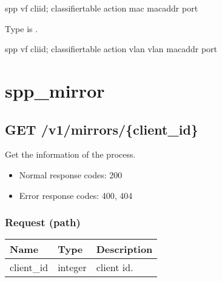 \documentclass[a4paper,11pt,openany,oneside,english]{sphinxmanual}
\begin{document}
\begin{sphinxVerbatim}[commandchars=\\\{\},formatcom=\footnotesize]
spp \PYGZgt{} vf \PYGZob{}cli\PYGZus{}id\PYGZcb{}; classifier\PYGZus{}table \PYGZob{}action\PYGZcb{} mac \PYGZob{}mac\PYGZus{}addr\PYGZcb{} \PYGZob{}port\PYGZcb{}
\end{sphinxVerbatim}

Type is .

\begin{sphinxVerbatim}[commandchars=\\\{\},formatcom=\footnotesize]
spp \PYGZgt{} vf \PYGZob{}cli\PYGZus{}id\PYGZcb{}; classifier\PYGZus{}table \PYGZob{}action\PYGZcb{} vlan \PYGZob{}vlan\PYGZcb{} \PYGZob{}mac\PYGZus{}addr\PYGZcb{} \PYGZob{}port\PYGZcb{}
\end{sphinxVerbatim}


\section{spp\_mirror}
\label{\detokenize{api_ref/spp_mirror:spp-mirror}}\label{\detokenize{api_ref/spp_mirror:spp-ctl-rest-api-spp-mirror}}\label{\detokenize{api_ref/spp_mirror::doc}}

\subsection{GET /v1/mirrors/\{client\_id\}}
\label{\detokenize{api_ref/spp_mirror:get-v1-mirrors-client-id}}
Get the information of the  process.
\begin{itemize}
\item {} 
Normal response codes: 200

\item {} 
Error response codes: 400, 404

\end{itemize}


\subsubsection{Request (path)}
\label{\detokenize{api_ref/spp_mirror:request-path}}

\begin{savenotes}\sphinxattablestart
\centering
{}
\sphinxthecaptionisattop
{}\label{\detokenize{api_ref/spp_mirror:id14}}\label{\detokenize{api_ref/spp_mirror:table-spp-ctl-mirrors-get}}
\sphinxaftertopcaption
\begin{tabulary}{\linewidth}[t]{|T|T|T|}
\hline
\sphinxstyletheadfamily 
Name
&\sphinxstyletheadfamily 
Type
&\sphinxstyletheadfamily 
Description
\\
\hline
client\_id
&
integer
&
client id.
\\
\hline
\end{tabulary}
\par
\sphinxattableend\end{savenotes}
\end{document}
